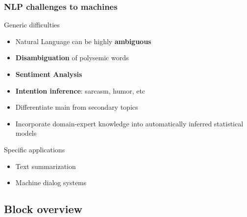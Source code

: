 \documentclass{beamer}
\begin{document}
\begin{frame}

	\frametitle{NLP challenges to machines}

	\large
	
	\begin{block}{Generic difficulties}
	\begin{itemize}
	
		\item Natural Language can be highly {\bf ambiguous}
		\item {\bf Disambiguation} of polysemic words
		\item {\bf Sentiment Analysis}
		\item {\bf Intention inference}: sarcasm, humor, etc
		\item Differentiate main from secondary topics
		\item Incorporate domain-expert knowledge into automatically inferred statistical models
	
	\end{itemize}
	\end{block}

	\begin{block}{Specific applications}
	\begin{itemize}
	
		\item Text summarization
		\item Machine dialog systems
	
	\end{itemize}
	\end{block}


\end{frame}


\subsection{Block overview}
\end{document}
